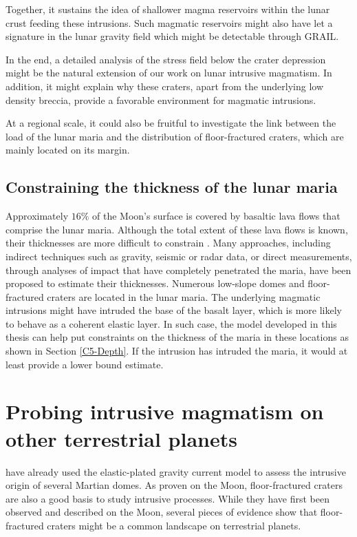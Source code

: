 Together, it sustains the idea of shallower magma reservoirs within the
lunar crust  feeding these intrusions. Such  magmatic reservoirs might
also have  let a signature in  the lunar gravity field  which might be
detectable through GRAIL.

In the end,  a detailed analysis of the stress  field below the crater
depression  might  be the  natural  extension  of  our work  on  lunar
intrusive magmatism. In addition, it  might explain why these craters,
apart from  the underlying  low density  breccia, provide  a favorable
environment for magmatic intrusions.

At a regional scale, it could also be fruitful to investigate the link
between  the  load  of  the   lunar  maria  and  the  distribution  of
floor-fractured craters, which are mainly located on its margin.

\subsection{Constraining the thickness of the lunar maria}
\label{sec:thickn-lunar-maria}

Approximately $16\%$ of the Moon's surface is covered by basaltic lava
flows  that comprise  the lunar  maria. Although  the total  extent of
these lava  flows is  known, their thicknesses  are more  difficult to
constrain \citep{Thomson:2009eo}. Many  approaches, including indirect
techniques  such  as  gravity,  seismic   or  radar  data,  or  direct
measurements,  through   analyses  of  impact  that   have  completely
penetrated   the  maria,   have  been   proposed  to   estimate  their
thicknesses. Numerous low-slope domes  and floor-fractured craters are
located in the  lunar maria. The underlying  magmatic intrusions might
have intruded  the base of the  basalt layer, which is  more likely to
behave as a coherent elastic layer.  In such case, the model developed
in this thesis can help put  constraints on the thickness of the maria
in  these  locations  as  shown in  Section  \ref{C5-Depth}.   If  the
intrusion has  intruded the maria, it  would at least provide  a lower
bound estimate.

\section{Probing intrusive magmatism on other terrestrial planets}
\label{sec:other-terr-plan}

\citet{Michaut:2013dr}  have already  used the  elastic-plated gravity
current  model  to assess  the  intrusive  origin of  several  Martian
domes. As proven on the Moon,  floor-fractured craters are also a good
basis  to  study  intrusive  processes. While  they  have  first  been
observed and  described on the  Moon, several pieces of  evidence show
that  floor-fractured   craters  might   be  a  common   landscape  on
terrestrial planets.

